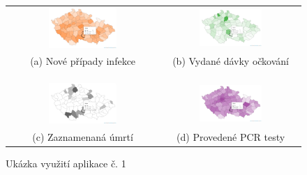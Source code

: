\vspace*{0.5in}
\begin{figure}[h]
\centering
\begin{tabular}{cc}
  \includegraphics[width=0.47\textwidth]{Pictures/showcase5a.png} &   \includegraphics[width=0.47\textwidth]{Pictures/showcase5b.png} \\
(a) Nové případy infekce & (b) Vydané dávky očkování \\[6pt]
\\
\\
\\
 \includegraphics[width=0.47\textwidth]{Pictures/showcase5c.png} &   \includegraphics[width=0.47\textwidth]{Pictures/showcase5d.png} \\
(c) Zaznamenaná úmrtí & (d) Provedené PCR testy \\[6pt]
\end{tabular}
\caption{Ukázka využití aplikace č. 1}
\label{showcase5}
\end{figure}

